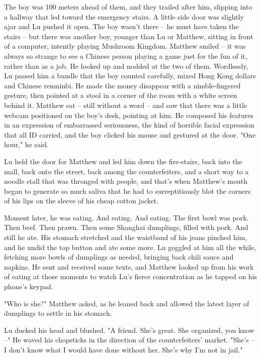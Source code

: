 The boy was 100 meters ahead of them, and they trailed after him,
slipping into a hallway that led toward the emergency stairs. A
little side door was slightly ajar and Lu pushed it open. The boy
wasn't there -- he must have taken the stairs -- but there was
another boy, younger than Lu or Matthew, sitting in front of a
computer, intently playing Mushroom Kingdom. Matthew smiled -- it
was always so strange to see a Chinese person playing a game just
for the fun of it, rather than as a job. He looked up and nodded at
the two of them. Wordlessly, Lu passed him a bundle that the boy
counted carefully, mixed Hong Kong dollars and Chinese renminbi. He
made the money disappear with a nimble-fingered gesture, then
pointed at a stool in a corner of the room with a white screen
behind it. Matthew sat -- still without a word -- and saw that
there was a little webcam positioned on the boy's desk, pointing at
him. He composed his features in an expression of embarrassed
seriousness, the kind of horrible facial expression that all ID
carried, and the boy clicked his mouse and gestured at the door.
"One hour," he said.

Lu held the door for Matthew and led him down the fire-stairs, back
into the mall, back onto the street, back among the counterfeiters,
and a short way to a noodle stall that was thronged with people,
and that's when Matthew's mouth began to generate so much saliva
that he had to surreptitiously blot the corners of his lips on the
sleeve of his cheap cotton jacket.

Moment later, he was eating. And eating. And eating. The first bowl
was pork. Then beef. Then prawn. Then some Shanghai dumplings,
filled with pork. And still he ate. His stomach stretched and the
waistband of his jeans pinched him, and he undid the top button and
ate some more. Lu goggled at him all the while, fetching more bowls
of dumplings as needed, bringing back chili sauce and napkins. He
sent and received some texts, and Matthew looked up from his work
of eating at those moments to watch Lu's fierce concentration as he
tapped on his phone's keypad.

"Who is she?" Matthew asked, as he leaned back and allowed the
latest layer of dumplings to settle in his stomach.

Lu ducked his head and blushed. "A friend. She's great. She
organized, you know --" He waved his chopsticks in the direction of
the counterfeiters' market. "She's -- I don't know what I would
have done without her. She's why I'm not in jail."

